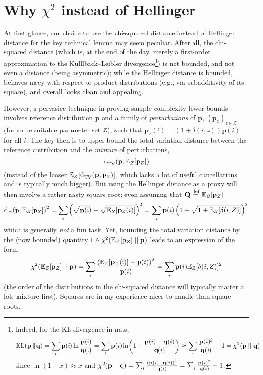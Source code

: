 \documentclass[10pt]{article}
\newcommand{\p}{\mathbf{p}}
\newcommand{\q}{\mathbf{q}}
\newcommand{\bigq}{\mathbf{Q}}
\begin{document}
\section{Why $\chi^2$ instead of Hellinger}\label{sec:hell:yeah:chisquare}
At first glance, our choice to use the chi-squared distance instead of Hellinger distance for the key technical lemma may seem peculiar. After all, the chi-squared distance (which is, at the end of the day, merely a first-order approximation to the Kulllback--Leibler divergence\footnote{Indeed, for the KL divergence in nats,
\[
    \kldiv{\p}{\q} = \sum_{i} \p(i)\ln\frac{\p(i)}{\q(i)} = \sum_{i} \p(i)\ln\mleft(1+\frac{\p(i)-\q(i)}{\q(i)} \mright) \approx \sum_{i} \frac{\p(i)^2}{\q(i)} - 1 = \chisquare{\p}{\q}
\]
since $\ln(1+x) \approx x$ and $\chisquare{\p}{\q} = \sum_{i} \frac{(\p(i)-\q(i))^2}{\q(i)} = \sum_{i} \frac{\p(i)^2}{\q(i)} - 1$.
}) is not bounded, and not even a distance (being asymmetric); while the Hellinger distance is bounded, behaves nicey with respect to product distributions (e.g., via subadditivity of its square), and overall looks clean and appealing.

However, a pervasice technique in proving sample complexity lower bounds involves reference distribution $\p$ and a family of \emph{perturbations} of $\p$, $(\p_z)_{z\in\mathcal{Z}}$ (for some suitable parameter set $\mathcal{Z}$), such that $\p_z(i) = (1+\delta(i,z))\p(i)$ for all $i$. The key then is to upper bound the total variation distance between the reference distribution and the \emph{mixture} of perturbations,
\[
    \totalvardist{ \p }{ \shortexpect_Z[\p_Z] }
\]
(instead of the looser $\shortexpect_Z[ \totalvardist{ \p }{ \p_Z } ]$, which lacks a lot of useful cancellations and is typically much bigger). But using the Hellinger distance as a proxy will then involve a rather nasty square root: even assuming that $\bigq \eqdef \shortexpect_Z[\p_Z]$
\[
    \hellinger{ \p }{ \shortexpect_Z[\p_Z] }^2 = \sum_i \left( \sqrt{\p(i)} - \sqrt{\shortexpect_Z[\p_Z(i)]} \right)^2
    = \sum_i \p(i)\left( 1 - \sqrt{1+\shortexpect_Z[\delta(i,Z)]} \right)^2
\]
which is generally \emph{not} a fun task. Yet, bounding the total variation distance by the (now bounded) quantity $1\land \chisquare{ \shortexpect_Z[\p_Z] }{ \p }$ leads to an expression of the form
\[
    \chisquare{ \shortexpect_Z[\p_Z] }{ \p } = \sum_i \frac{\left( \shortexpect_Z[\p_Z(i)] - \p(i) \right)^2}{\p(i)}
    = \sum_i \p(i)\shortexpect_Z[\delta(i,Z)]^2
\]
(the order of the distributions in the chi-squared distance will typically matter a lot: mixture first). Squares are in my experience nicer to handle than square roots. 
\end{document}
